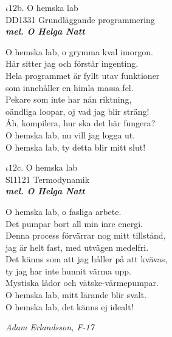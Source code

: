 \documentclass[a6paper,10pt]{article}
\newcommand{\mel}[1]{\small\textbf{\textit{mel. #1 \\}}}
\begin{document}
\begin{center}
\Large $\iota12$b. O hemska lab \\ 
\footnotesize DD1331 Grundläggande programmering\\
\mel{O Helga Natt}
\end{center}
O hemska lab, o grymma kval imorgon. \\
Här sitter jag och förstår ingenting. \\
Hela programmet är fyllt utav funktioner\\
som innehåller en himla massa fel. 
\vspace{5pt} \\
Pekare som inte har nån riktning, \\
oändliga loopar, oj vad jag blir sträng!
\vspace{5pt} \\
Åh, kompilera, hur ska det här fungera? \\
O hemska lab, nu vill jag logga ut. \\
O hemska lab, ty detta blir mitt slut! 

\begin{center}
\Large $\iota12$c. O hemska lab \\ 
\footnotesize SI1121 Termodynamik\\
\mel{O Helga Natt}
\end{center}
O hemska lab, o fasliga arbete. \\
Det pumpar bort all min inre energi. \\
Denna process förvärrar nog mitt tillstånd, \\
jag är helt fast, med utvägen medelfri. 
\vspace{5pt} \\
Det känns som att jag håller på att kvävas, \\
ty jag har inte hunnit värma upp. 
\vspace{5pt} \\
Mystiska lådor och vätske-värmepumpar. \\
O hemska lab, mitt lärande blir svalt. \\
O hemska lab, det känns ej idealt! 
\begin{flushright}
\textit{Adam Erlandsson, F-17}
\end{flushright}
\end{document}
